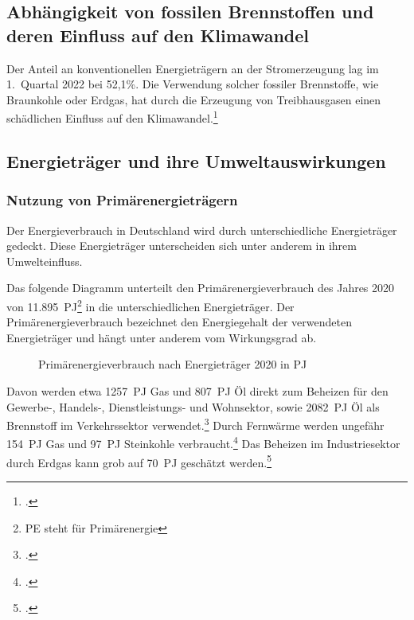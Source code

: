 \documentclass[12pt, ngerman]{article}
\newcommand{\pe}{_{\mathrm{PE}}}
\begin{document}
\subsection{Abhängigkeit von fossilen Brennstoffen und deren Einfluss auf den Klimawandel}

Der Anteil an konventionellen Energieträgern an der Stromerzeugung lag im 1.\ Quartal 2022 bei 52,1\%.
Die Verwendung solcher fossiler Brennstoffe, wie Braunkohle oder Erdgas, hat durch die Erzeugung von
Treibhausgasen einen schädlichen Einfluss auf den Klimawandel.\footcite{wilkeErneuerbareUndKonventionelle2013}

\subsection{Energieträger und ihre Umweltauswirkungen}

\subsubsection{Nutzung von Primärenergieträgern}\label{subsec:primar}

Der Energieverbrauch in Deutschland wird durch unterschiedliche Energieträger gedeckt.
Diese Energieträger unterscheiden sich unter anderem in ihrem Umwelteinfluss.

Das folgende Diagramm unterteilt den Primärenergieverbrauch des Jahres 2020 von
\qty{11.895}{PJ\pe}\footnote{PE steht für Primärenergie}
in die unterschiedlichen Energieträger.
Der Primärenergieverbrauch bezeichnet den Energiegehalt der verwendeten Energieträger und
hängt unter anderem vom Wirkungsgrad ab.

\begin{figure}[!h]
    \caption{Primärenergieverbrauch nach Energieträger 2020 in
        \unit{PJ\pe}}
\end{figure}


Davon werden etwa \qty{1257}{PJ\pe} Gas und \qty{807}{PJ\pe} Öl direkt zum Beheizen für den Gewerbe-, Handels-,
Dienstleistungs- und Wohnsektor, sowie \qty{2082}{PJ\pe} Öl als Brennstoff im Verkehrssektor verwendet.\footcite{Energieflussbild2020PJLang}
Durch Fernwärme werden ungefähr \qty{154}{PJ\pe} Gas und \qty{97}{PJ\pe} Steinkohle verbraucht.\footcite{WieKannTransformation}
Das Beheizen im Industriesektor durch Erdgas kann grob auf \qty{70}{PJ\pe} geschätzt werden.\footcite{Industrie}
\end{document}
